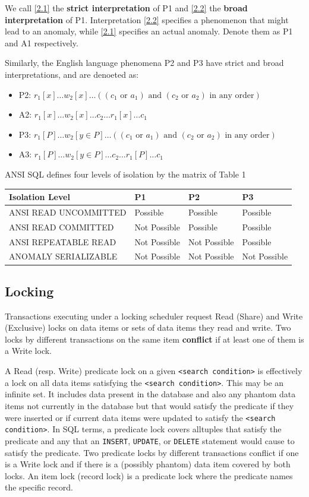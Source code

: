 \documentclass[11pt]{article}
\begin{document}
We call \eqref{2.1} the \textbf{strict interpretation} of P1 and \eqref{2.2} the \textbf{broad interpretation} of P1.
Interpretation \eqref{2.2} specifies a phenomenon that might lead to an anomaly, while \eqref{2.1}
specifies an actual anomaly. Denote them as P1 and A1 respectively.

Similarly, the English language phenomena P2 and P3 have strict and broad interpretations, and are
denoeted as:
\begin{itemize}
\item P2: \(r_1[x]\dots w_2[x]\dots((c_1\text{ or }a_1)\text{ and }(c_2\text{ or }a_2)\text{ in any
         order})\)
\item A2: \(r_1[x]\dots w_2[x]\dots c_2\dots r_1[x]\dots c_1\)
\item P3: \(r_1[P]\dots w_2[y\in P]\dots((c_1\text{ or }a_1)\text{ and }(c_2\text{ or }a_2)\text{ in any
          order})\)
\item A3: \(r_1[P]\dots w_2[y\in P]\dots c_2\dots r_1[P]\dots c_1\)
\end{itemize}


ANSI SQL defines four levels of isolation by the matrix of Table 1
\begin{table}[htbp]
\label{1}
\centering
\begin{tabular}{llll}
\hline
Isolation Level & P1 & P2 & P3\\
\hline
ANSI READ UNCOMMITTED & Possible & Possible & Possible\\
ANSI READ COMMITTED & Not Possible & Possible & Possible\\
ANSI REPEATABLE READ & Not Possible & Not Possible & Possible\\
ANOMALY SERIALIZABLE & Not Possible & Not Possible & Not Possible\\
\hline
\end{tabular}
\end{table}
\subsection{Locking}
\label{sec:org94bd97e}
Transactions executing under a locking scheduler request Read (Share) and Write (Exclusive) locks on
data items or sets of data items they read and write. Two locks by different transactions on the same
item \textbf{conflict} if at least one of them is a Write lock.

A Read (resp. Write) predicate lock on a given \texttt{<search condition>} is effectively a lock on all data
items satisfying the \texttt{<search condition>}. This may be an infinite set. It includes data present in the
database and also any phantom data items not currently in the database but that would satisfy the
predicate if they were inserted or if current data items were updated to satisfy the
\texttt{<search condition>}. In SQL terms, a predicate lock covers alltuples that satisfy the predicate and any
that an \texttt{INSERT}, \texttt{UPDATE}, or \texttt{DELETE} statement would cause to satisfy the predicate. Two predicate locks
by different transactions conflict if one is a Write lock and if there is a (possibly phantom) data
item covered by both locks. An item lock (record lock) is a predicate lock where the predicate names
the specific record.
\end{document}
